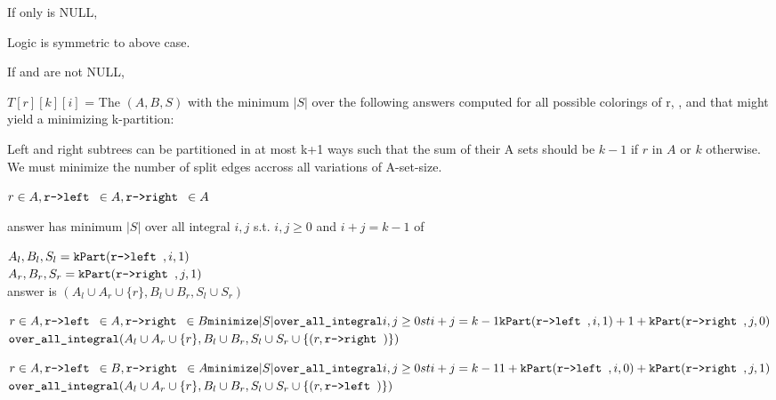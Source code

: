 \documentclass[11pt]{article}
\begin{document}
\begin{indentmore}
\begin{indentmore}
       \end{indentmore}
    If only \rright is NULL,
        \begin{indentmore}
        Logic is symmetric to above case.
        \end{indentmore}

    If \rleft and \rright are not NULL,
        \begin{indentmore}
        $T[r][k][i]$ = The $(A,B,S)$ with the minimum $|S|$ over the following answers computed for all possible colorings of r, \rright, and \rleft that might yield a minimizing k-partition:
                \begin{indentmore}
                Left and right subtrees can be partitioned in at most k+1 ways such that the sum of their A sets should be $k-1$ if $r$ in $A$ or $k$ otherwise.\\
                We must minimize the number of split edges accross all variations of A-set-size.
                \end{indentmore}

          $r \in A, \texttt{r->left } \in A, \texttt{r->right } \in A$
              \begin{indentmore}
              answer has minimum $|S|$ over all integral $i,j$  s.t. $i,j \geq 0$ and $i+j = k-1$ of
                \begin{indentmore}
                $A_l, B_l, S_l = \mathtt{kPart}(\texttt{r->left },i,1)$\\
                $A_r, B_r, S_r = \mathtt{kPart}(\texttt{r->right },j,1)$\\
                answer is $(A_l \cup A_r \cup \{r\},B_l \cup B_r,S_l \cup S_r)$
                \end{indentmore}
              \end{indentmore}

          $r \in A, \texttt{r->left } \in A, \texttt{r->right } \in B\\
              \texttt{minimize} |S| \texttt{over\_all\_integral} i,j \geq 0 st i+j = k-1\\
                    \mathtt{kPart}(\texttt{r->left },i,1) + 1 + \mathtt{kPart}(\texttt{r->right },j,0)$\\
                $\texttt{over\_all\_integral} (A_l \cup A_r \cup \{r\},B_l \cup B_r,S_l \cup S_r \cup \{(r, \texttt{r->right })\})$

          $r \in A, \texttt{r->left } \in B, \texttt{r->right } \in A\\
              \texttt{minimize} |S| \texttt{over\_all\_integral} i,j \geq 0 st i+j = k-1\\
                1 + \mathtt{kPart}(\texttt{r->left },i,0) +     \mathtt{kPart}(\texttt{r->right },j,1)$\\
                $\texttt{over\_all\_integral} (A_l \cup A_r \cup \{r\},B_l \cup B_r,S_l \cup S_r \cup \{(r, \texttt{r->left })\})$


\end{indentmore}
\end{indentmore}
\end{document}
